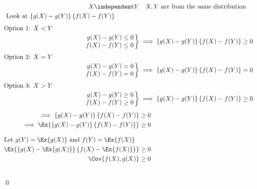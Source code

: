 \documentclass[12pt, letterpaper]{article}
\begin{document}
\begin{align*}
X \independent Y & \quad X, Y \text{ are from the same distribution}
\\
\omit\rlap{ Look at $\left\{ g(X) - g(Y) \right\} \left\{ f(X) - f(Y) \right\}$}
\\[1ex]
\omit\rlap{Option 1: $X < Y$}
\\
\left.
\arraycolsep=1.4pt
\begin{array}{r c l}
g(X) - g(Y) &\leq& 0 \\
f(X) - f(Y) &\leq& 0
\end{array}
\right\}
& \implies \left\{ g(X) - g(Y) \right\} \left\{ f(X) - f(Y) \right\} \geq 0 
\\[1ex]
\omit\rlap{Option 2: $X = Y$}
\\
\left.
\arraycolsep=1.4pt
\begin{array}{r c l}
g(X) - g(Y) &=& 0 \\
f(X) - f(Y) &=& 0
\end{array}
\right\}
& \implies \left\{ g(X) - g(Y) \right\} \left\{ f(X) - f(Y) \right\} = 0 
\\[1ex]
\omit\rlap{Option 3: $X > Y$}
\\
\left.
\arraycolsep=1.4pt
\begin{array}{r c l}
g(X) - g(Y) &\geq& 0 \\
f(X) - f(Y) &\geq& 0
\end{array}
\right\}
& \implies \left\{ g(X) - g(Y) \right\} \left\{ f(X) - f(Y) \right\} \geq 0 
\\[1ex]
\implies \left\{ g(X) - g(Y) \right\} \left\{ f(X) - f(Y) \right\} &\geq 0  
\\
\implies \Ex{ \left\{ g(X) - g(Y) \right\} \left\{ f(X) - f(Y) \right\} }
& \geq 0 
\\[2ex]
\omit\rlap{Let $g(Y) = \Ex{g(X)}$ and $f(Y) = \Ex{f(X)}$}
\\
\Ex{ \left\{ g(X) - \Ex{g(X)} \right\} \left\{ f(X) - \Ex{f(X)} \right\} }
& \geq 0 
\\
\Cov{ f(X), g(X)} & \geq 0 
\end{align*} \vspace{-48pt} \\ \qed 
\end{document}

